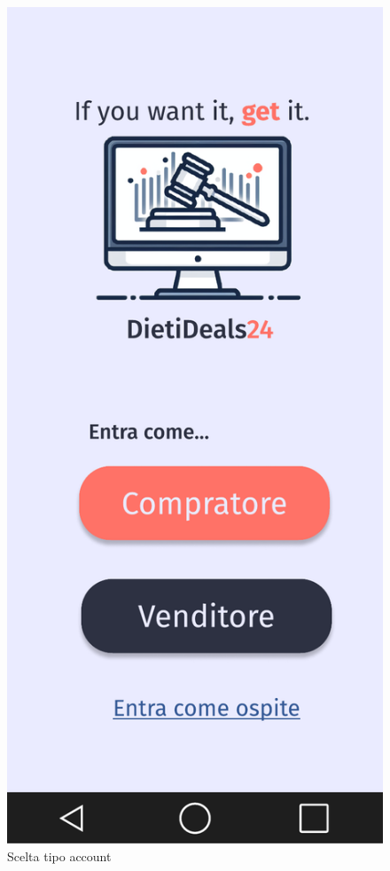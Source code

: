     \begin{figure}[!htb]
        \begin{minipage}{0.32\textwidth}
            \centering
            \includegraphics[width=.7\linewidth]{Immagini/Frames/0.pdf}
            \caption{Scelta tipo account}
        \end{minipage}\hfill
        \begin{minipage}{0.32\textwidth}
            \centering

\end{minipage}
\end{figure}
